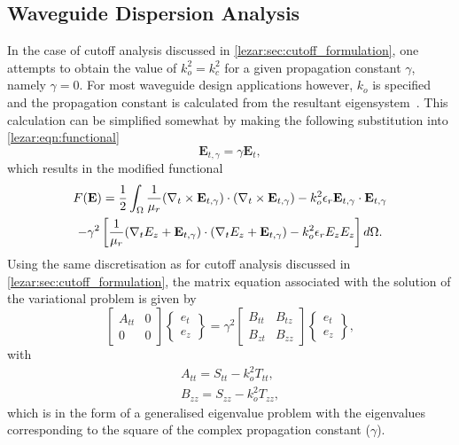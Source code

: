 \subsection{Waveguide Dispersion Analysis}
\label{lezar:sec:propagation_curves}
In the case of cutoff analysis discussed in
\ref{lezar:sec:cutoff_formulation}, one attempts to obtain the value of
$k_o^2 = k_c^2$ for a given propagation constant $\gamma$,
namely $\gamma = 0$.  For most waveguide design applications however,
$k_o$ is specified and the propagation constant is calculated
from the resultant eigensystem~\cite{Jin2002, PelCoc1998}.  This
calculation can be simplified somewhat by making the following
substitution into \eqref{lezar:eqn:functional}
\begin{equation}
    \mathbf{E}_{t,\gamma} = \gamma\mathbf{E}_t,
\end{equation}
which results in the modified functional
\begin{multline}
    \label{lezar:eqn:functional_scaled}
    F(\mathbf{E}) =
    \frac{1}{2}\int_{\Omega}\frac{1}{\mu_r}(\curl{\mathbf{E}_{t,\gamma}}{t})\cdot(\curl{\mathbf{E}_{t,\gamma}}{t}) -k_o^2\epsilon_r\mathbf{E}_{t,\gamma}\cdot{\mathbf{E}_{t,\gamma}}\\
    -\gamma^2\left[\frac{1}{\mu_r}(\nabla_t{E_z} +
    \mathbf{E}_{t,\gamma})\cdot(\nabla_t{E_z} + \mathbf{E}_{t,\gamma})-k_o^2\epsilon_r
    E_z{E_z}\right] d\Omega.
\end{multline}
Using the same discretisation as for cutoff analysis discussed in \ref{lezar:sec:cutoff_formulation}, the matrix equation associated with the solution of the variational problem is given by
\begin{equation}
    \label{lezar:eqn:matrix_equation_dispersion}
    \begin{bmatrix} A_{tt} & 0\\0 & 0\end{bmatrix}\begin{Bmatrix}e_t\\e_z\end{Bmatrix} = 
    \gamma^2\begin{bmatrix} B_{tt} & B_{tz}\\B_{zt} &
    B_{zz}\end{bmatrix}\begin{Bmatrix}e_t\\e_z\end{Bmatrix},
\end{equation}
with
\begin{align}
    A_{tt} = S_{tt} - k_o^2 T_{tt},\\
    B_{zz} = S_{zz} - k_o^2 T_{zz},
\end{align}
which is in the form of a generalised eigenvalue
problem with the eigenvalues corresponding
to the square of the complex propagation constant ($\gamma$).

